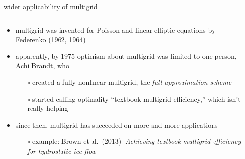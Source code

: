 \documentclass[hide notes,intlimits,usenames,dvipsnames]{beamer}
\begin{document}
\begin{frame}{wider applicability of multigrid}

\begin{columns}
\begin{column}{0.8\textwidth}
\begin{itemize}
\item multigrid was invented for Poisson and linear elliptic equations by Federenko (1962, 1964)
\item apparently, by 1975 optimism about multigrid was limited to one person, Achi Brandt, who
    \begin{itemize}
    \item[$\circ$] created a fully-nonlinear multigrid, the \emph{full approximation scheme}
    \item[$\circ$] started calling optimality ``textbook multigrid efficiency,'' which isn't really helping
    \end{itemize}

\bigskip
\item since then, multigrid has succeeded on more and more applications
    \begin{itemize}
    \footnotesize
    \item[$\circ$] example: Brown et al.~(2013), \emph{Achieving textbook multigrid efficiency for hydrostatic
ice flow}
    \end{itemize}
\end{itemize}
\end{column}

\begin{column}{0.2\textwidth}


\end{column}
\end{columns}
\end{frame}
\end{document}
